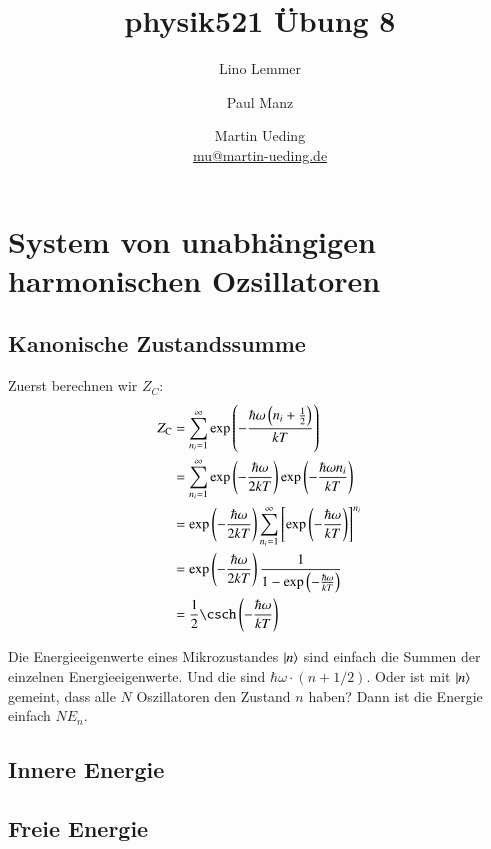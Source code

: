 

\title{physik521 Übung 8}
\author{
    Lino Lemmer
    \and
    Paul Manz
    \and
    Martin Ueding \\ {\small \href{mailto:mu@martin-ueding.de}{mu@martin-ueding.de}}
}



\maketitle

\section{System von unabhängigen harmonischen Ozsillatoren}

\subsection{Kanonische Zustandssumme}

Zuerst berechnen wir $Z_C$:
\begin{align*}
    Z_\text C
    &= \sum_{n_i=1}^\infty \exp\del{- \frac{\hbar\omega \del{n_i + \frac 12}}{kT}} \\
    &= \sum_{n_i=1}^\infty \exp\del{- \frac{\hbar\omega}{2kT}} \exp\del{- \frac{\hbar\omega n_i}{kT}} \\
    &= \exp\del{- \frac{\hbar\omega}{2kT}} \sum_{n_i=1}^\infty \sbr{\exp\del{- \frac{\hbar\omega}{kT}}}^{n_i} \\
    &= \exp\del{- \frac{\hbar\omega}{2kT}} \frac1{1 - \exp\del{- \frac{\hbar\omega}{kT}}} \\
    &= \frac 12 \csch\del{- \frac{\hbar\omega}{kT}} \\
\end{align*}

Die Energieeigenwerte eines Mikrozustandes $\left|n\right\rangle$ sind einfach die Summen der einzelnen Energieeigenwerte. Und die sind $\hbar\omega\cdot(n + 1/2)$. Oder ist mit $\left|n\right\rangle$ gemeint, dass alle $N$ Oszillatoren den Zustand $n$ haben? Dann ist die Energie einfach $N E_n$.

\subsection{Innere Energie}

\subsection{Freie Energie}

